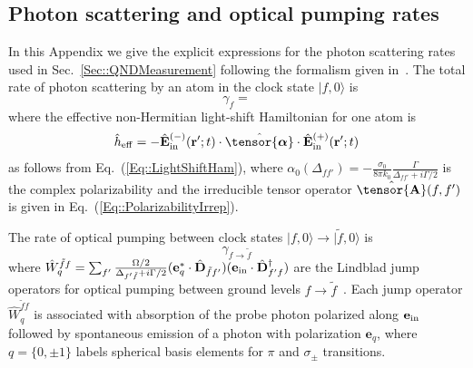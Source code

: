 \documentclass[preprint,aps,pra,onecolumn,superscriptaddress]{revtex4-1} %
\def\bra#1{\langle{#1}\rvert}%
\def\ket#1{\lvert{#1}\rangle}%
\newcommand{\erf}[1]{Eq.~(\ref{#1})}
\newcommand{\mbf}[1]{\mathbf{#1}}
\newcommand{\poltens}{\hat{\tensor{\boldsymbol{\alpha}}}}
\newcommand{\charpol}{\alpha_0(\Delta_{f\!f'})}
\begin{document}
\begin{appendix}

\section{Photon scattering and optical pumping rates} \label{Appendix::Rates}

In this Appendix we give the explicit expressions for the photon scattering rates used in Sec.~\ref{Sec::QNDMeasurement} following the formalism given in~\cite{deutsch_quantum_2010}.  The total rate of photon scattering by an atom in the clock state $\ket{f,0}$ is
	\begin{equation}\label{Eq::gammaf}
		\gamma_{f}=
	\end{equation}
where the effective non-Hermitian light-shift Hamiltonian for one atom is
\begin{align}
\hat{h}_{\rm eff} = - \hat{\mathbf{E}}^{(-)}_{\rm in}(\mathbf{r}' ; t ) \cdot \poltens \cdot \hat{\mathbf{E}}^{(+)}_{\rm in}(\mathbf{r}' ;t )
\end{align}
as follows from \erf{Eq::LightShiftHam}, where $\charpol = -\frac{\sigma_0}{8\pi k_0}\frac{\Gamma}{\Delta_{ff'}+i\Gamma/2}$ is the complex polarizability and the irreducible tensor operator $ \hat{\tensor{\mbf{A}}}(f,f') $ is given in \erf{Eq::PolarizabilityIrrep}.


The rate of optical pumping between clock states $\ket{f,0} \rightarrow \ket{\tilde{f},0}$ is
	\begin{equation}\label{Eq::gammaff}
		\gamma_{f \rightarrow \tilde{f} }
	\end{equation}
where $ \hat{W}_q^{\tilde{f}f} = \sum_{f'}\frac{\Omega/2}{\Delta_{f'\tilde{f}}+i\Gamma/2}(\mathbf{e}_q^*\cdot\hat{\mathbf{D}}_{\tilde{f} f'} )(\mathbf{e}_{\rm in}\cdot \hat{\mathbf{D}}^\dagger_{f'f} ) $ are the Lindblad jump operators for optical pumping between ground levels $ f\rightarrow \tilde{f} $~\cite{deutsch_quantum_2010}.
Each jump operator $\hat{W}_q^{\tilde{f}f}$ is associated with absorption of the probe photon polarized along $ \mathbf{e}_{\rm in} $ followed by spontaneous emission of a photon with polarization $ \mathbf{e}_q $, where $q= \{0,\pm 1\}$ labels spherical basis elements for $\pi$ and $ \sigma_\pm$ transitions.


\end{appendix}
\end{document}
